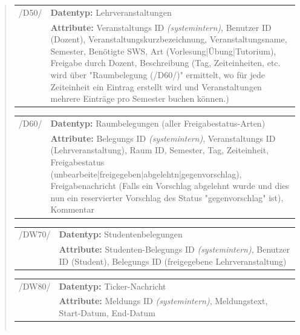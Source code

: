\begin{quote}
\begin{tabular}{p{1.5cm}p{14.5cm}}
	 /D50/	& \textbf{Datentyp:} Lehrveranstaltungen \\
				& \textbf{Attribute:} Veranstaltungs ID \textsl{(systemintern)}, Benutzer ID (Dozent), Veranstaltungskurzbezeichnung, Veranstaltungsname, Semester, Benötigte SWS, Art (Vorlesung|Übung|Tutorium), Freigabe durch Dozent, Beschreibung (Tag, Zeiteinheiten, etc. wird über "Raumbelegung (/D60/)" ermittelt, wo für jede Zeiteinheit ein Eintrag erstellt wird und Veranstaltungen mehrere Einträge pro Semester buchen können.) \\[0.25cm]

\end{tabular}


\begin{tabular}{p{1.5cm}p{14.5cm}}
					
	 /D60/	& \textbf{Datentyp:} Raumbelegungen (aller Freigabestatus-Arten) \\
				& \textbf{Attribute:} Belegungs ID \textsl{(systemintern)}, Veranstaltungs ID (Lehrveranstaltung), Raum ID, Semester, Tag, Zeiteinheit, Freigabestatus (unbearbeite|freigegeben|abgelehtn|gegenvorschlag), Freigabenachricht (Falls ein Vorschlag abgelehnt wurde und dies nun ein reservierter Vorschlag des Status "gegenvorschlag" ist), Kommentar  \\[0.25cm]

\end{tabular}


\begin{tabular}{p{1.5cm}p{14.5cm}}
		
	 /DW70/& \textbf{Datentyp:} Studentenbelegungen \\
				& \textbf{Attribute:} Studenten-Belegungs ID \textsl{(systemintern)}, Benutzer ID (Student), Belegungs ID (freigegebene Lehrveranstaltung) \\[0.25cm]

\end{tabular}


\begin{tabular}{p{1.5cm}p{14.5cm}}
					
	 /DW80/& \textbf{Datentyp:} Ticker-Nachricht \\
				& \textbf{Attribute:} Meldungs ID \textsl{(systemintern)}, Meldungstext, Start-Datum, End-Datum \\[0.25cm]
		
\end{tabular}

\begin{tabular}{p{1.5cm}p{14.5cm}}
					

\end{tabular}
\end{quote}
